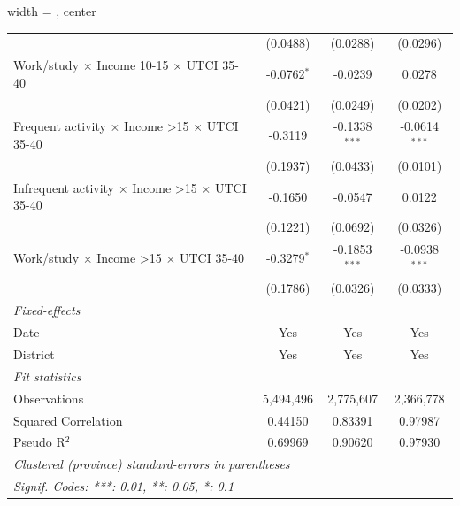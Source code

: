 \begin{table}[htbp]
\begin{adjustbox}{width = \textwidth, center}
\begin{tabular}{lccc}
                                                                         & (0.0488)                  & (0.0288)                & (0.0296)\\   
         Work/study $\times$ Income 10-15 $\times$ UTCI 35-40            & -0.0762$^{*}$             & -0.0239                 & 0.0278\\   
                                                                         & (0.0421)                  & (0.0249)                & (0.0202)\\   
         Frequent activity $\times$ Income >15 $\times$ UTCI 35-40       & -0.3119                   & -0.1338$^{***}$         & -0.0614$^{***}$\\   
                                                                         & (0.1937)                  & (0.0433)                & (0.0101)\\   
         Infrequent activity $\times$ Income >15 $\times$ UTCI 35-40     & -0.1650                   & -0.0547                 & 0.0122\\   
                                                                         & (0.1221)                  & (0.0692)                & (0.0326)\\   
         Work/study $\times$ Income >15 $\times$ UTCI 35-40              & -0.3279$^{*}$             & -0.1853$^{***}$         & -0.0938$^{***}$\\   
                                                                         & (0.1786)                  & (0.0326)                & (0.0333)\\   
         \midrule
         \emph{Fixed-effects}\\
         Date                                                            & Yes                       & Yes                     & Yes\\  
         District                                                        & Yes                       & Yes                     & Yes\\  
         \midrule
         \emph{Fit statistics}\\
         Observations                                                    & 5,494,496                 & 2,775,607               & 2,366,778\\  
         Squared Correlation                                             & 0.44150                   & 0.83391                 & 0.97987\\  
         Pseudo R$^2$                                                    & 0.69969                   & 0.90620                 & 0.97930\\  
         \midrule \midrule
         \multicolumn{4}{l}{\emph{Clustered (province) standard-errors in parentheses}}\\
         \multicolumn{4}{l}{\emph{Signif. Codes: ***: 0.01, **: 0.05, *: 0.1}}\\
      \end{tabular}
   \end{adjustbox}
\end{table}


